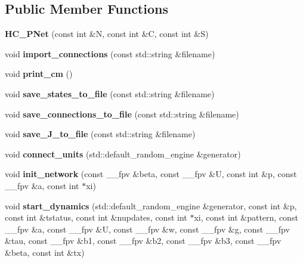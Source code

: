 \subsection*{Public Member Functions}
\begin{DoxyCompactItemize}
\item 
\hypertarget{class_h_c___p_net_a5c7aca1e9fa59ca5aee29894de0b970f}{}{\bfseries H\+C\+\_\+\+P\+Net} (const int \&N, const int \&C, const int \&S)\label{class_h_c___p_net_a5c7aca1e9fa59ca5aee29894de0b970f}

\item 
\hypertarget{class_h_c___p_net_a91cd9aaa6acbf80f6dcca26ba1e5cd4f}{}void {\bfseries import\+\_\+connections} (const std\+::string \&filename)\label{class_h_c___p_net_a91cd9aaa6acbf80f6dcca26ba1e5cd4f}

\item 
\hypertarget{class_h_c___p_net_a49ff9fe01c408c0c028d736135dd4ef3}{}void {\bfseries print\+\_\+cm} ()\label{class_h_c___p_net_a49ff9fe01c408c0c028d736135dd4ef3}

\item 
\hypertarget{class_h_c___p_net_a0f1e9277e2f5320ff638c9d6adf7c1db}{}void {\bfseries save\+\_\+states\+\_\+to\+\_\+file} (const std\+::string \&filename)\label{class_h_c___p_net_a0f1e9277e2f5320ff638c9d6adf7c1db}

\item 
\hypertarget{class_h_c___p_net_a7d72eed734dc1a8c42f760db4ce19f0a}{}void {\bfseries save\+\_\+connections\+\_\+to\+\_\+file} (const std\+::string \&filename)\label{class_h_c___p_net_a7d72eed734dc1a8c42f760db4ce19f0a}

\item 
\hypertarget{class_h_c___p_net_aaf22bc06a174cbe262a0ddbceb8cb079}{}void {\bfseries save\+\_\+\+J\+\_\+to\+\_\+file} (const std\+::string \&filename)\label{class_h_c___p_net_aaf22bc06a174cbe262a0ddbceb8cb079}

\item 
\hypertarget{class_h_c___p_net_a404e5bb38475c42180d615e2dda8418d}{}void {\bfseries connect\+\_\+units} (std\+::default\+\_\+random\+\_\+engine \&generator)\label{class_h_c___p_net_a404e5bb38475c42180d615e2dda8418d}

\item 
\hypertarget{class_h_c___p_net_afff5ec340c4a16084b2d8668a3c96a2f}{}void {\bfseries init\+\_\+network} (const \+\_\+\+\_\+fpv \&beta, const \+\_\+\+\_\+fpv \&U, const int \&p, const \+\_\+\+\_\+fpv \&a, const int $\ast$xi)\label{class_h_c___p_net_afff5ec340c4a16084b2d8668a3c96a2f}

\item 
\hypertarget{class_h_c___p_net_a23cc68c5ef1225dddda2e3b5f11f5d80}{}void {\bfseries start\+\_\+dynamics} (std\+::default\+\_\+random\+\_\+engine \&generator, const int \&p, const int \&tstatus, const int \&nupdates, const int $\ast$xi, const int \&pattern, const \+\_\+\+\_\+fpv \&a, const \+\_\+\+\_\+fpv \&U, const \+\_\+\+\_\+fpv \&w, const \+\_\+\+\_\+fpv \&g, const \+\_\+\+\_\+fpv \&tau, const \+\_\+\+\_\+fpv \&b1, const \+\_\+\+\_\+fpv \&b2, const \+\_\+\+\_\+fpv \&b3, const \+\_\+\+\_\+fpv \&beta, const int \&tx)\label{class_h_c___p_net_a23cc68c5ef1225dddda2e3b5f11f5d80}

\end{DoxyCompactItemize}
